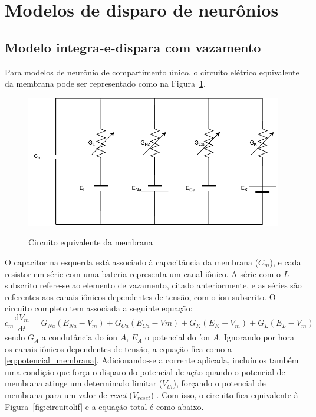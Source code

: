 \section{Modelos de disparo de neurônios}\label{sec:modelosdisparo}
\subsection{Modelo integra-e-dispara com vazamento}\label{sec:modelolif}

Para modelos de neurônio de compartimento único, o circuito elétrico equivalente da membrana pode ser representado como na Figura~\ref{fig:circuitomembrana}.
\begin{figure}[htb!]
	\centering
	\caption{Circuito equivalente da membrana}
	\label{fig:circuitomembrana}
	\includegraphics[width=0.7\linewidth]{figs/circuito_membrana}\\
\end{figure}
O capacitor na esquerda está associado à capacitância da membrana ($C_m$), e cada resistor em série com uma bateria representa um canal iônico. A série com o $L$ subscrito refere-se ao elemento de vazamento, citado anteriormente, e as séries são referentes aos canais iônicos dependentes de tensão, com o íon subscrito. O circuito completo tem associada a seguinte equação:
\begin{equation}\label{eq:potencial_membrana_total}
	c_m\frac{\mathrm{d}V_m}{\mathrm{d}t}=G_{Na}(E_{Na}-V_m)+G_{Ca}(E_{Ca}-Vm)+G_K(E_K-V_m)+G_L(E_L-V_m)
\end{equation}
sendo $G_A$ a condutância do íon $A$, $E_A$ o potencial do íon $A$. Ignorando por hora os canais iônicos dependentes de tensão, a equação fica como a \ref{eq:potencial_membrana}. Adicionando-se a corrente aplicada, incluímos também uma condição que força o disparo do potencial de ação quando o potencial de membrana atinge um determinado limitar ($V_{th}$), forçando o potencial de membrana para um valor de \textit{reset} ($V_{reset}$) \cite{miller_introductory_2018}. Com isso, o circuito fica equivalente à Figura~\ref{fig:circuitolif} e a equação total é como abaixo.
